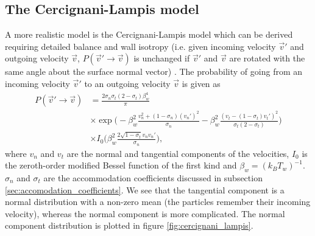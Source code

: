\subsection{The Cercignani-Lampis model}
\label{sec:cercignani_lampis}
A more realistic model is the Cercignani-Lampis model which can be derived requiring detailed balance and wall isotropy (i.e. given incoming velocity $\vec v'$ and outgoing velocity $\vec v$, $P(\vec v' \rightarrow \vec v)$ is unchanged if $\vec v'$ and $\vec v$ are rotated with the same angle about the surface normal vector) \cite{cowling1974cercignani}. The probability of going from an incoming velocity $\vec v'$ to an outgoing velocity $\vec v$ is given as
\begin{align}
	\nonumber
	P(\vec v'\rightarrow \vec v) &= \frac{2\sigma_n\sigma_t(2-\sigma_t)\beta_w^4}{\pi}\\
	\nonumber
	&\times\exp\Big(-\beta_w^2\frac{v_n^2 + (1-\sigma_n)(v_n')^2}{\sigma_n} - \beta_w^2\frac{(v_t - (1 - \sigma_t)v_t')^2}{\sigma_t(2 - \sigma_t)}\Big)\\
	&\times I_0\Big(\beta_w^2\frac{2\sqrt{1 - \sigma_t}v_nv_n'}{\sigma_n}\Big),
\end{align}
where $v_n$ and $v_t$ are the normal and tangential components of the velocities, $I_0$ is the zeroth-order modified Bessel function of the first kind and $\beta_w = (k_BT_w)^{-1}$. $\sigma_n$ and $\sigma_t$ are the accommodation coefficients discussed in subsection \ref{sec:accomodation_coefficients}. We see that the tangential component is a normal distribution with a non-zero mean (the particles remember their incoming velocity), whereas the normal component is more complicated. The normal component distribution is plotted in figure \ref{fig:cercignani_lampis}.
